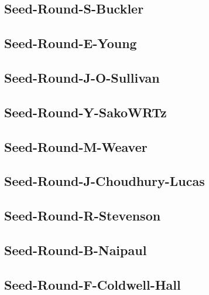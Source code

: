 \documentclass[letterpaper,10pt,english]{sphinxmanual}
\begin{document}
\subsection{Seed-Round-S-Buckler}
\label{\detokenize{statements:seed-round-s-buckler}}

\subsection{Seed-Round-E-Young}
\label{\detokenize{statements:seed-round-e-young}}

\subsection{Seed-Round-J-O-Sullivan}
\label{\detokenize{statements:seed-round-j-o-sullivan}}

\subsection{Seed-Round-Y-SakoWRTz}
\label{\detokenize{statements:seed-round-y-sakowrtz}}

\subsection{Seed-Round-M-Weaver}
\label{\detokenize{statements:seed-round-m-weaver}}

\subsection{Seed-Round-J-Choudhury-Lucas}
\label{\detokenize{statements:seed-round-j-choudhury-lucas}}

\subsection{Seed-Round-R-Stevenson}
\label{\detokenize{statements:seed-round-r-stevenson}}

\subsection{Seed-Round-B-Naipaul}
\label{\detokenize{statements:seed-round-b-naipaul}}

\subsection{Seed-Round-F-Coldwell-Hall}
\label{\detokenize{statements:seed-round-f-coldwell-hall}}
\end{document}
